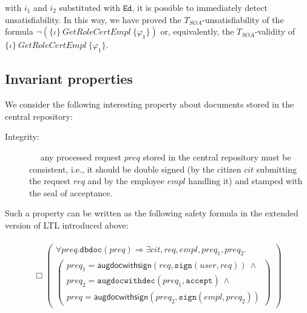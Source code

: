 \documentclass[conference]{IEEEtran}
\newcommand{\close}{\IEEEQEDclosed}
\begin{document}
\begin{LONG}
\noindent
  with $i_1$ and $i_2$ substituted with $\mathtt{Ed}$, it is possible
  to immediately detect unsatisfiability.  In this way, we have proved
  the $T_\mathit{SOA}$-unsatisfiability of the formula $\neg (\{ \iota \}~
  \mathit{GetRoleCertEmpl} ~ \{ \varphi_1\})$ or, equivalently, the
  $T_\mathit{SOA}$-validity of $\{ \iota \}~ \mathit{GetRoleCertEmpl} ~ \{
  \varphi_1\}$. \hfill \close


\subsection*{Invariant properties}
We consider the following interesting property about documents stored
in the central repository:
\begin{description}
\item[Integrity:] ~~ any processed request $\mathit{preq}$ stored in the
  central repository must be consistent, i.e., it should be double
  signed (by the citizen $\mathit{cit}$ submitting the request
  $\mathit{req}$ and by the employee $\mathit{empl}$ handling it) and
  stamped with the seal of acceptance.
\end{description}
Such a property can be written as the following safety formula in
the extended version of LTL introduced above:

{\small
\begin{eqnarray*}
  \begin{array}{l}
  \Box \left(
  \begin{array}{l}
    \forall \mathit{preq}. \mathtt{dbdoc}(\mathit{preq})
    \Rightarrow 
    \exists \mathit{cit}, \mathit{req}, \mathit{empl}, 
            \mathit{preq}_1, \mathit{preq}_2. \\
     \left(
      \begin{array}{lcll}
        {\mathit{preq}_1}  =  
        \mathsf{augdocwithsign}(\mathit{req}, 
                                  \mathtt{sign}(\mathit{user}, \mathit{req})) ~ \wedge \\
        {\mathit{preq}_2}  = 
        \mathtt{augdocwithdec}({\mathit{preq}_1},
           \mathtt{accept})  ~ \wedge \\
        \mathit{preq} =
        \mathsf{augdocwithsign}({\mathit{preq}_2},
          \mathtt{sign}(\mathit{empl},{\mathit{preq}_2})) 
       \end{array}                                 
     \right)  
    \end{array}
    \right)
    \end{array}
   \end{eqnarray*}
 } 


\end{LONG}
\end{document}
